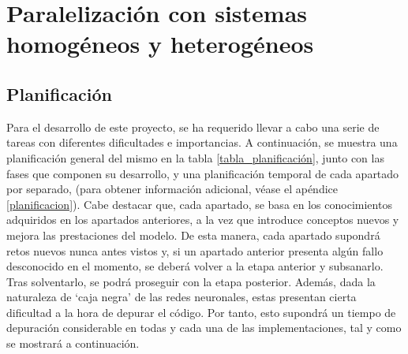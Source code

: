 \chapter{Paralelización con sistemas homogéneos y heterogéneos}

\section{Planificación}

Para el desarrollo de este proyecto, se ha requerido llevar a cabo una serie de tareas con diferentes dificultades e importancias. A continuación, se muestra una planificación general del mismo en la tabla \ref{tabla_planificación}, junto con las fases que componen su desarrollo, y una planificación temporal de cada apartado por separado,  (para obtener información adicional, véase el apéndice \ref{planificacion}). Cabe destacar que, cada apartado, se basa en los conocimientos adquiridos en los apartados anteriores, a la vez que introduce conceptos nuevos y mejora las prestaciones del modelo. De esta manera, cada apartado supondrá retos nuevos nunca antes vistos y, si un apartado anterior presenta algún fallo desconocido en el momento, se deberá volver a la etapa anterior y subsanarlo. Tras solventarlo, se podrá proseguir con la etapa posterior. Además, dada la naturaleza de `caja negra' de las redes neuronales, estas presentan cierta dificultad a la hora de depurar el código. Por tanto, esto supondrá un tiempo de depuración considerable en todas y cada una de las implementaciones, tal y como se mostrará a continuación.

